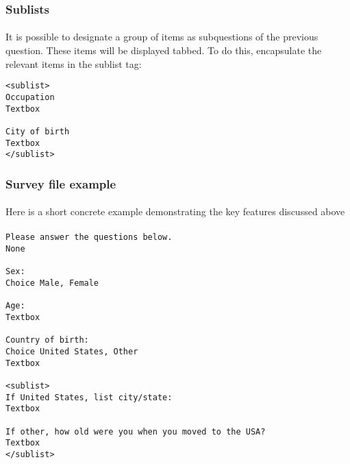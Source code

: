\subsubsection{Sublists}

\paragraph{}
It is possible to designate a group of items as subquestions of the previous question.  These items will be displayed tabbed.  To do this, encapsulate the relevant items in the sublist tag:

\begin{lstlisting}
<sublist>
Occupation
Textbox

City of birth
Textbox
</sublist>
\end{lstlisting}

\subsubsection{Survey file example}

\paragraph{}
Here is a short concrete example demonstrating the key features discussed above

\paragraph{}

\begin{tcolorbox}[breakable,colback=white,colframe=blue,width=\dimexpr\textwidth+12mm\relax,enlarge left by=-6mm,enlarge right by=6mm]

\begin{lstlisting}
Please answer the questions below.
None

Sex: 
Choice Male, Female

Age:
Textbox

Country of birth:
Choice United States, Other
Textbox

<sublist>
If United States, list city/state:
Textbox

If other, how old were you when you moved to the USA?
Textbox
</sublist>

\end{lstlisting}

\end{tcolorbox}

